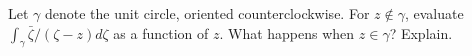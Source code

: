 Let $\gamma$ denote the unit circle, oriented counterclockwise. For
$z\notin \gamma$, evaluate $\int_{\gamma}\bar{\zeta}/(\zeta-z)d\zeta$
as a function of $z$. What happens when $z\in \gamma$? Explain.
